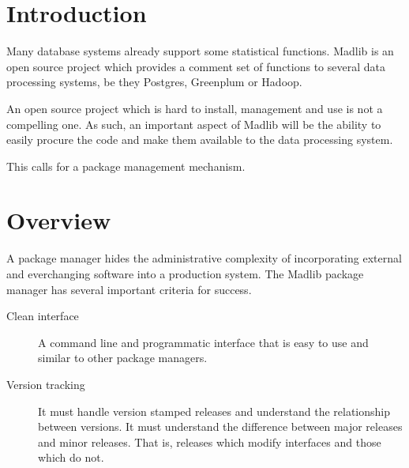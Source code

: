 \documentclass[11pt]{article}
\newcommand{\versionnumber}{0.1}
\begin{document}
{
\noindent\hspace*{\centeroffset}

\noindent\makebox[0pt][l]
{\begin{minipage}{\textwidth}
\flushright
Version~\versionnumber{}.
\end{minipage}}

\newpage

\tableofcontents
\newpage

\section{Introduction}

Many database systems already support some statistical functions. Madlib is an
open source project which provides a comment set of functions to several data
processing systems, be they Postgres, Greenplum or Hadoop.

An open source project which is hard to install, management and use is not a
compelling one. As such, an important aspect of Madlib will be the ability to
easily procure the code and make them available to the data processing system.

This calls for a package management mechanism.

\ifx\pdfoutput\undefined %
\else
{}
\fi
\section{Overview}

A package manager hides the administrative complexity of incorporating external
and everchanging software into a production system. The Madlib package manager
has several important criteria for success.

	\begin{description}
		\item[Clean interface] A command line and programmatic interface
		that is easy to use and similar to other package managers.

		\item[Version tracking] It must handle version stamped releases and
		understand the relationship between versions. It must understand
		the difference between major releases and minor releases. That is,
		releases which modify interfaces and those which do not.


\end{description}}
\end{document}
